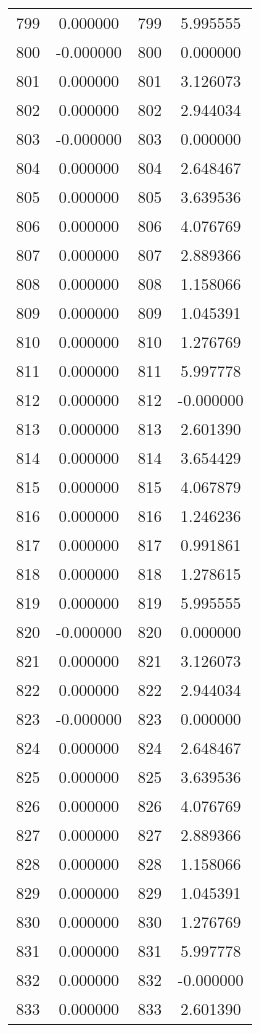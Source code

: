 \documentclass[12pt]{article}
\begin{document}
\begin{longtable}{@{}cccc@{}}
799 & 0.000000 & 799 & 5.995555 \\
800 & -0.000000 & 800 & 0.000000 \\
801 & 0.000000 & 801 & 3.126073 \\
802 & 0.000000 & 802 & 2.944034 \\
803 & -0.000000 & 803 & 0.000000 \\
804 & 0.000000 & 804 & 2.648467 \\
805 & 0.000000 & 805 & 3.639536 \\
806 & 0.000000 & 806 & 4.076769 \\
807 & 0.000000 & 807 & 2.889366 \\
808 & 0.000000 & 808 & 1.158066 \\
809 & 0.000000 & 809 & 1.045391 \\
810 & 0.000000 & 810 & 1.276769 \\
811 & 0.000000 & 811 & 5.997778 \\
812 & 0.000000 & 812 & -0.000000 \\
813 & 0.000000 & 813 & 2.601390 \\
814 & 0.000000 & 814 & 3.654429 \\
815 & 0.000000 & 815 & 4.067879 \\
816 & 0.000000 & 816 & 1.246236 \\
817 & 0.000000 & 817 & 0.991861 \\
818 & 0.000000 & 818 & 1.278615 \\
819 & 0.000000 & 819 & 5.995555 \\
820 & -0.000000 & 820 & 0.000000 \\
821 & 0.000000 & 821 & 3.126073 \\
822 & 0.000000 & 822 & 2.944034 \\
823 & -0.000000 & 823 & 0.000000 \\
824 & 0.000000 & 824 & 2.648467 \\
825 & 0.000000 & 825 & 3.639536 \\
826 & 0.000000 & 826 & 4.076769 \\
827 & 0.000000 & 827 & 2.889366 \\
828 & 0.000000 & 828 & 1.158066 \\
829 & 0.000000 & 829 & 1.045391 \\
830 & 0.000000 & 830 & 1.276769 \\
831 & 0.000000 & 831 & 5.997778 \\
832 & 0.000000 & 832 & -0.000000 \\
833 & 0.000000 & 833 & 2.601390 \\

\end{longtable}
\end{document}
